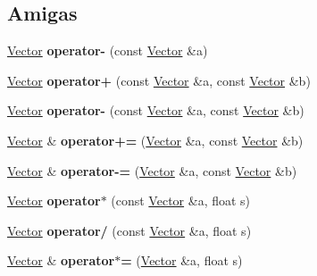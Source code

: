 \subsection*{Amigas}
\begin{DoxyCompactItemize}
\item 
\hypertarget{classVector_abf2b446e7047f3f0556b53e4ce7868d0}{}\hyperlink{classVector}{Vector} {\bfseries operator-\/} (const \hyperlink{classVector}{Vector} \&a)\label{classVector_abf2b446e7047f3f0556b53e4ce7868d0}

\item 
\hypertarget{classVector_a53d6a19cb17320a43a60e4356f80c205}{}\hyperlink{classVector}{Vector} {\bfseries operator+} (const \hyperlink{classVector}{Vector} \&a, const \hyperlink{classVector}{Vector} \&b)\label{classVector_a53d6a19cb17320a43a60e4356f80c205}

\item 
\hypertarget{classVector_a316d381a8ae7de1d299f2131a042a349}{}\hyperlink{classVector}{Vector} {\bfseries operator-\/} (const \hyperlink{classVector}{Vector} \&a, const \hyperlink{classVector}{Vector} \&b)\label{classVector_a316d381a8ae7de1d299f2131a042a349}

\item 
\hypertarget{classVector_a4fb2d244db84da243c5931a907fedb45}{}\hyperlink{classVector}{Vector} \& {\bfseries operator+=} (\hyperlink{classVector}{Vector} \&a, const \hyperlink{classVector}{Vector} \&b)\label{classVector_a4fb2d244db84da243c5931a907fedb45}

\item 
\hypertarget{classVector_ade89f1f57dfe0f62585d061044d01ae4}{}\hyperlink{classVector}{Vector} \& {\bfseries operator-\/=} (\hyperlink{classVector}{Vector} \&a, const \hyperlink{classVector}{Vector} \&b)\label{classVector_ade89f1f57dfe0f62585d061044d01ae4}

\item 
\hypertarget{classVector_a0bad8928a0e05294b614b3843cfe63a2}{}\hyperlink{classVector}{Vector} {\bfseries operator$\ast$} (const \hyperlink{classVector}{Vector} \&a, float s)\label{classVector_a0bad8928a0e05294b614b3843cfe63a2}

\item 
\hypertarget{classVector_a5d3b08c505c7eae71de50dbb3d21a5cf}{}\hyperlink{classVector}{Vector} {\bfseries operator/} (const \hyperlink{classVector}{Vector} \&a, float s)\label{classVector_a5d3b08c505c7eae71de50dbb3d21a5cf}

\item 
\hypertarget{classVector_a0643b5488c2ae01d7c78a9c2939c7601}{}\hyperlink{classVector}{Vector} \& {\bfseries operator$\ast$=} (\hyperlink{classVector}{Vector} \&a, float s)\label{classVector_a0643b5488c2ae01d7c78a9c2939c7601}


\end{DoxyCompactItemize}
